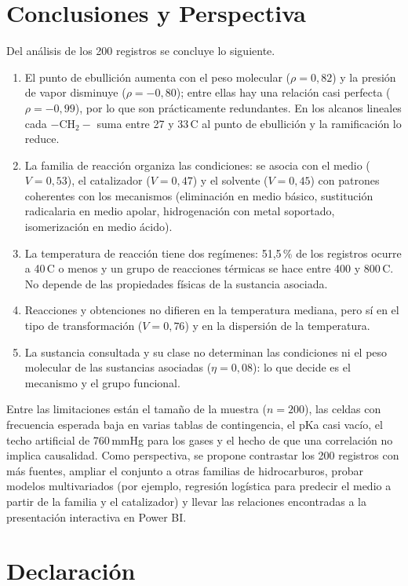 \documentclass[twoside,twocolumn,10pt]{article}
\begin{document}
\section{Conclusiones y Perspectiva}
Del an\'alisis de los 200 registros se concluye lo siguiente.
\begin{enumerate}
\item El punto de ebullici\'on aumenta con el peso molecular ($\rho=0{,}82$) y la presi\'on de vapor disminuye ($\rho=-0{,}80$); entre ellas hay una relaci\'on casi perfecta ($\rho=-0{,}99$), por lo que son pr\'acticamente redundantes. En los alcanos lineales cada $-\mathrm{CH_2}-$ suma entre 27 y 33\,\textdegree C al punto de ebullici\'on y la ramificaci\'on lo reduce.
\item La familia de reacci\'on organiza las condiciones: se asocia con el medio ($V=0{,}53$), el catalizador ($V=0{,}47$) y el solvente ($V=0{,}45$) con patrones coherentes con los mecanismos (eliminaci\'on en medio b\'asico, sustituci\'on radicalaria en medio apolar, hidrogenaci\'on con metal soportado, isomerizaci\'on en medio \'acido).
\item La temperatura de reacci\'on tiene dos reg\'imenes: 51,5\,\% de los registros ocurre a 40\,\textdegree C o menos y un grupo de reacciones t\'ermicas se hace entre 400 y 800\,\textdegree C. No depende de las propiedades f\'isicas de la sustancia asociada.
\item Reacciones y obtenciones no difieren en la temperatura mediana, pero s\'i en el tipo de transformaci\'on ($V=0{,}76$) y en la dispersi\'on de la temperatura.
\item La sustancia consultada y su clase no determinan las condiciones ni el peso molecular de las sustancias asociadas ($\eta=0{,}08$): lo que decide es el mecanismo y el grupo funcional.
\end{enumerate}

Entre las limitaciones est\'an el tama\~no de la muestra ($n=200$), las celdas con frecuencia esperada baja en varias tablas de contingencia, el pKa casi vac\'io, el techo artificial de 760\,mmHg para los gases y el hecho de que una correlaci\'on no implica causalidad. Como perspectiva, se propone contrastar los 200 registros con m\'as fuentes, ampliar el conjunto a otras familias de hidrocarburos, probar modelos multivariados (por ejemplo, regresi\'on log\'istica para predecir el medio a partir de la familia y el catalizador) y llevar las relaciones encontradas a la presentaci\'on interactiva en Power BI.

\section{Declaración}
\fontsize{11}{13}\selectfont
\end{document}
